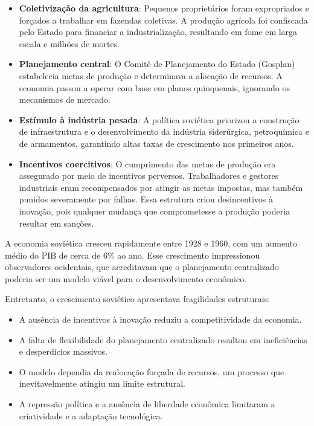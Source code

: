 \documentclass[a4paper,12pt]{article}[abntex2]
\begin{document}
\begin{itemize}
    \item \textbf{Coletivização da agricultura}: Pequenos proprietários foram expropriados e forçados a trabalhar em fazendas coletivas. A produção agrícola foi confiscada pelo Estado para financiar a industrialização, resultando em fome em larga escala e milhões de mortes.
    
    \item \textbf{Planejamento central}: O Comitê de Planejamento do Estado (Gosplan) estabelecia metas de produção e determinava a alocação de recursos. A economia passou a operar com base em planos quinquenais, ignorando os mecanismos de mercado.
    
    \item \textbf{Estímulo à indústria pesada}: A política soviética priorizou a construção de infraestrutura e o desenvolvimento da indústria siderúrgica, petroquímica e de armamentos, garantindo altas taxas de crescimento nos primeiros anos.
    
    \item \textbf{Incentivos coercitivos}: O cumprimento das metas de produção era assegurado por meio de incentivos perversos. Trabalhadores e gestores industriais eram recompensados por atingir as metas impostas, mas também punidos severamente por falhas. Essa estrutura criou desincentivos à inovação, pois qualquer mudança que comprometesse a produção poderia resultar em sanções.
\end{itemize}

A economia soviética cresceu rapidamente entre 1928 e 1960, com um aumento médio do PIB de cerca de 6\% ao ano. Esse crescimento impressionou observadores ocidentais, que acreditavam que o planejamento centralizado poderia ser um modelo viável para o desenvolvimento econômico.

Entretanto, o crescimento soviético apresentava fragilidades estruturais:

\begin{itemize}
    \item A ausência de incentivos à inovação reduziu a competitividade da economia.
    \item A falta de flexibilidade do planejamento centralizado resultou em ineficiências e desperdícios massivos.
    \item O modelo dependia da realocação forçada de recursos, um processo que inevitavelmente atingiu um limite estrutural.
    \item A repressão política e a ausência de liberdade econômica limitaram a criatividade e a adaptação tecnológica.
\end{itemize}
\end{document}
